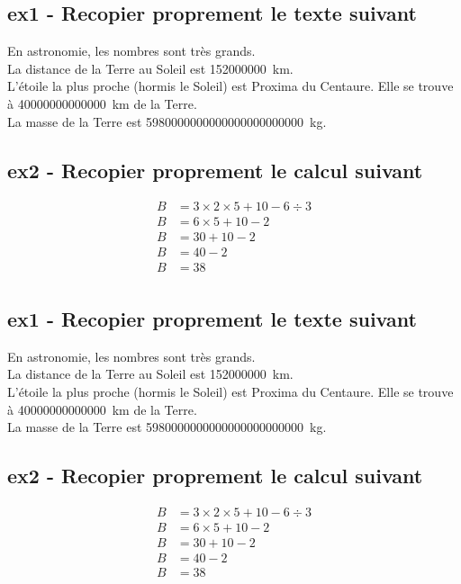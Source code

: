 



\subsection*{ex1 - Recopier proprement le texte suivant}

En astronomie, les nombres sont très grands. \\
La distance de la Terre au Soleil est \SI{152 000 000}{\km}. \\
L'étoile la plus proche (hormis le Soleil) est Proxima du Centaure. Elle se trouve à \SI{40 000 000 000 000}{km} de la Terre.\\
La masse de la Terre est \SI{5 980 000 000 000 000 000 000 000}{kg}.

\subsection*{ex2 - Recopier proprement le calcul suivant }

\begin{align*}
    B &= 3 \times 2 \times 5 + 10 - 6 \div 3  \\
    B &= 6 \times 5 + 10 - 2\\
    B &= 30 + 10 - 2 \\
    B &= 40 - 2\\
    B &= 38\\  
\end{align*}


\subsection*{ex1 - Recopier proprement le texte suivant}

En astronomie, les nombres sont très grands. \\
La distance de la Terre au Soleil est \SI{152 000 000}{\km}. \\
L'étoile la plus proche (hormis le Soleil) est Proxima du Centaure. Elle se trouve à \SI{40 000 000 000 000}{km} de la Terre.\\
La masse de la Terre est \SI{5 980 000 000 000 000 000 000 000}{kg}.

\subsection*{ex2 - Recopier proprement le calcul suivant }

\begin{align*}
    B &= 3 \times 2 \times 5 + 10 - 6 \div 3  \\
    B &= 6 \times 5 + 10 - 2\\
    B &= 30 + 10 - 2 \\
    B &= 40 - 2\\
    B &= 38\\  
\end{align*}


